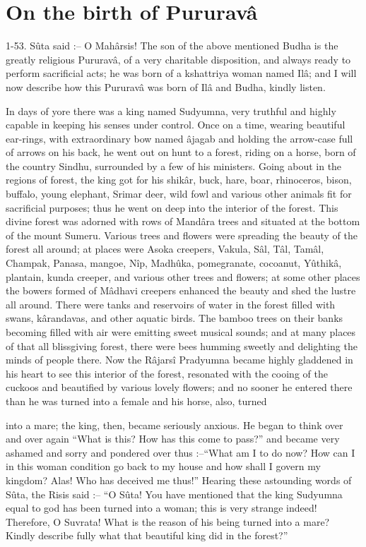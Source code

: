 \chapter{On the birth of Pururav\^a}

1-53. S\^uta said :-- O Mah\^arsis! The son of the above mentioned Budha is the greatly religious Pururav\^a, of a very charitable disposition, and always ready to perform sacrificial acts; he was born of a kshattriya woman named Il\^a; and I will now describe how this Pururav\^a was born of Il\^a and Budha, kindly listen.

In days of yore there was a king named Sudyumna, very truthful and highly capable in keeping his senses under control. Once on a time, wearing beautiful ear-rings, with extraordinary bow named \^ajagab and holding the arrow-case full of arrows on his back, he went out on hunt to a forest, riding on a horse, born of the country Sindhu, surrounded by a few of his ministers. Going about in the regions of forest, the king got for his shik\^ar, buck, hare, boar, rhinoceros, bison, buffalo, young elephant, Srimar deer, wild fowl and various other animals fit for sacrificial purposes; thus he went on deep into the interior of the forest. This divine forest was adorned with rows of Mand\^ara trees and situated at the bottom of the mount Sumeru. Various trees and flowers were spreading the beauty of the forest all around; at places were Asoka creepers, Vakula, S\^al, T\^al, Tam\^al, Champak, Panasa, mangoe, N\^ip, Madh\^uka, pomegranate, cocoanut, Y\^uthik\^a, plantain, kunda creeper, and various other trees and flowers; at some other places the bowers formed of M\^adhavi creepers enhanced the beauty and shed the lustre all around. There were tanks and reservoirs of water in the forest filled with swans, k\^arandavas, and other aquatic birds. The bamboo trees on their banks becoming filled with air were emitting sweet musical sounds; and at many places of that all blissgiving forest, there were bees humming sweetly and delighting the minds of people there. Now the R\^ajars\^i Pradyumna became highly gladdened in his heart to see this interior of the forest, resonated with the cooing of the cuckoos and beautified by various lovely flowers; and no sooner he entered there than he was turned into a female and his horse, also, turned

into a mare; the king, then, became seriously anxious. He began to think over and over again ``What is this? How has this come to pass?'' and became very ashamed and sorry and pondered over thus :--``What am I to do now? How can I in this woman condition go back to my house and how shall I govern my kingdom? Alas! Who has deceived me thus!'' Hearing these astounding words of S\^uta, the Risis said :-- ``O S\^uta! You have mentioned that the king Sudyumna equal to god has been turned into a woman; this is very strange indeed! Therefore, O Suvrata! What is the reason of his being turned into a mare? Kindly describe fully what that beautiful king did in the forest?''

